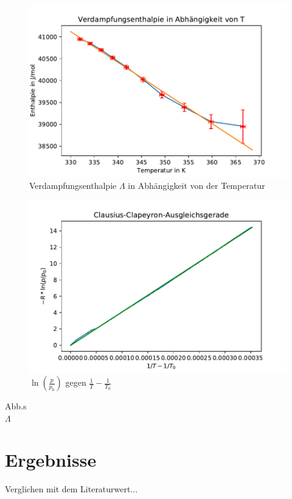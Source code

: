 \documentclass[]{article}
\begin{document}
\begin{figure}
	\begin{center}
		\includegraphics[scale=0.9]{Images/Dampfdruck_L.pdf}
		\caption{Verdampfungsenthalpie $\Lambda$ in Abhängigkeit von der Temperatur}
		\label{DD_L(T)}
	\end{center}
\end{figure}

\begin{figure}
	\begin{center}
		\includegraphics[scale=0.9]{Images/Dampfdruck_ln.pdf}
		\caption{$\ln(\frac{p}{p_0})$ gegen $\frac{1}{T} - \frac{1}{T_0}$}
		\label{DD_ln-1}
	\end{center}
\end{figure}

Abb.s\\
$\Lambda$\\ 
\section{Ergebnisse}
{\color{red} Verglichen mit dem Literaturwert...}
\end{document}
